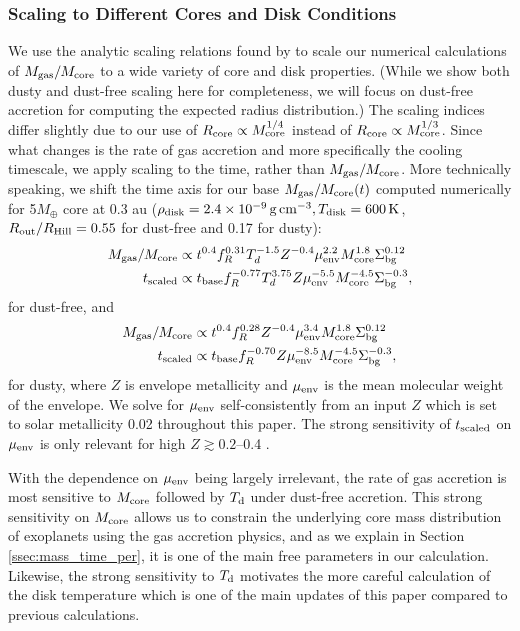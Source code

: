 \documentclass[twocolumn]{aastex631}
\begin{document}
\subsubsection{Scaling to Different Cores and Disk Conditions}
\label{sssec:scaling_cool}

We use the analytic scaling relations found by \citet{Lee15} to scale our numerical calculations of $M_{\rm gas}/M_{\rm core}$ to a wide variety of core and disk properties. (While we show both dusty and dust-free scaling here for completeness, we will focus on dust-free accretion for computing the expected radius distribution.) The scaling indices differ slightly due to our use of $R_{\rm core} \propto M_{\rm core}^{1/4}$ instead of $R_{\rm core} \propto M_{\rm core}^{1/3}$. Since what changes is the rate of gas accretion and more specifically the cooling timescale, we apply scaling to the time, rather than $M_{\rm gas}/M_{\rm core}$. More technically speaking, we shift the time axis for our base $M_{\rm gas}/M_{\rm core}(t)$ computed numerically for 5$M_\oplus$ core at 0.3 au ($\rho_{\rm disk}=2.4\times 10^{-9}\,{\rm g\,cm^{-3}}, T_{\rm disk}=600\,{\rm K}$, $R_{\rm out}/R_{\rm Hill}=0.55$ for dust-free and 0.17 for dusty):
%
\begin{align}
    M_{\rm gas}/M_{\rm core} &\propto t^{0.4} f_R^{0.31} T_d^{-1.5} Z^{-0.4} \mu_{\rm env}^{2.2} M_{\rm core}^{1.8} \Sigma_{\rm bg}^{0.12} \nonumber \\ 
    t_{\rm scaled} &\propto t_{\rm base} f_R^{-0.77} T_d^{3.75} Z \mu_{\rm env}^{-5.5} M_{\rm core}^{-4.5} \Sigma_{\rm bg}^{-0.3},
    \label{eq:gcr_tscl_df}
\end{align}
for dust-free, and
\begin{align}
    M_{\rm gas}/M_{\rm core} &\propto t^{0.4} f_R^{0.28} Z^{-0.4} \mu_{\rm env}^{3.4} M_{\rm core}^{1.8} \Sigma_{\rm bg}^{0.12} \nonumber \\ 
    t_{\rm scaled} &\propto t_{\rm base} f_R^{-0.70} Z \mu_{\rm env}^{-8.5} M_{\rm core}^{-4.5} \Sigma_{\rm bg}^{-0.3},
\end{align}
for dusty, where $Z$ is envelope metallicity and $\mu_{\rm env}$ is the mean molecular weight of the envelope. We solve for $\mu_{\rm env}$ self-consistently from an input $Z$ which is set to solar metallicity 0.02 throughout this paper. The strong sensitivity of $t_{\rm scaled}$ on $\mu_{\rm env}$ is only relevant for high $Z \gtrsim 0.2$--0.4 \citep[see][their Figure 1]{Lee16}. 

With the dependence on $\mu_{\rm env}$ being largely irrelevant, the rate of gas accretion is most sensitive to $M_{\rm core}$ followed by $T_{\rm d}$ under dust-free accretion. This strong sensitivity on $M_{\rm core}$ allows us to constrain the underlying core mass distribution of exoplanets using the gas accretion physics, and as we explain in Section \ref{ssec:mass_time_per}, it is one of the main free parameters in our calculation. Likewise, the strong sensitivity to $T_{\rm d}$ motivates the more careful calculation of the disk temperature which is one of the main updates of this paper compared to previous calculations.
\end{document}
